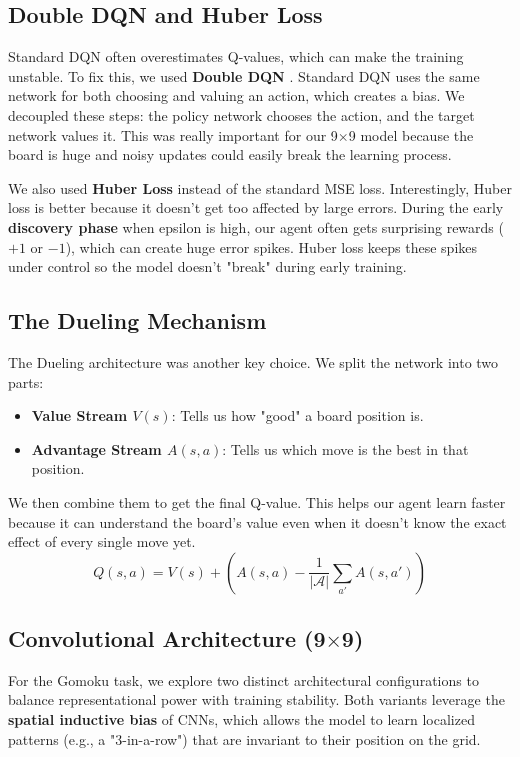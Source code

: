 \documentclass[9pt,a4paper,twocolumn,twoside]{rho-class/rho}
\begin{document}
    \subsection{Double DQN and Huber Loss}
        Standard DQN often overestimates Q-values, which can make the training unstable. To fix this, we used \textbf{Double DQN} \cite{hasselt2016}. Standard DQN uses the same network for both choosing and valuing an action, which creates a bias. We decoupled these steps: the policy network chooses the action, and the target network values it. This was really important for our 9$\times$9 model because the board is huge and noisy updates could easily break the learning process.

        We also used \textbf{Huber Loss} instead of the standard MSE loss. Interestingly, Huber loss is better because it doesn't get too affected by large errors. During the early \textbf{discovery phase} when epsilon is high, our agent often gets surprising rewards ($+1$ or $-1$), which can create huge error spikes. Huber loss keeps these spikes under control so the model doesn't "break" during early training.

    \subsection{The Dueling Mechanism}
        The Dueling architecture \cite{wang2016} was another key choice. We split the network into two parts:
        \begin{itemize}
            \item \textbf{Value Stream $V(s)$}: Tells us how "good" a board position is.
            \item \textbf{Advantage Stream $A(s, a)$}: Tells us which move is the best in that position.
        \end{itemize}
        We then combine them to get the final Q-value. This helps our agent learn faster because it can understand the board's value even when it doesn't know the exact effect of every single move yet.
        \begin{equation}
            Q(s, a) = V(s) + (A(s, a) - \frac{1}{|\mathcal{A}|} \sum_{a'} A(s, a'))
        \end{equation}

    \subsection{Convolutional Architecture (9$\times$9)}
        For the Gomoku task, we explore two distinct architectural configurations to balance representational power with training stability. Both variants leverage the \textbf{spatial inductive bias} of CNNs, which allows the model to learn localized patterns (e.g., a "3-in-a-row") that are invariant to their position on the grid.
        
\end{document}
